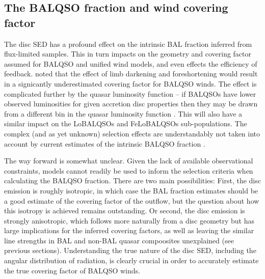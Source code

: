 \documentclass[preprint, a4paper, 11pt]{aastex}
\begin{document}
\subsection{The BALQSO fraction and wind covering factor}
\label{sec:balfrac}

The disc SED has a profound effect on the intrinsic BAL fraction
inferred from flux-limited samples. This in turn impacts on 
the geometry and covering factor assumed for BALQSO and unified wind models,
and even effects the efficiency of feedback.
\cite{krolik1998} noted that the effect of limb darkening and foreshortening
would result in a signicantly underestimated covering factor for BALQSO winds.
The effect is complicated further by the quasar luminosity function -- if 
BALQSOs have lower observed luminosities for given accretion disc properties 
then they may be drawn from a different bin in the quasar luminosity function 
\citep{goodrich1997}. This will also have a similar impact
on the LoBALQSOs and FeLoBALQSOs sub-populations.
The complex (and as yet unknown) selection effects are understandably 
not taken into account by current estimates of the intrinsic BALQSO fraction 
\citep{weymann1991, reichard2003, knigge2008, turnermiller2009, allen2011}. 

The way forward is somewhat unclear. Given the lack of available observational 
constraints, models cannot readily be used to inform the selection criteria when 
calculating the BALQSO fraction. There are two main possibilities:
First, the disc emission is roughly isotropic, in which case the BAL fraction
estimates should be a good estimate of the covering factor of the outflow,
but the question about how this isotropy is achieved remains outstanding.
Or second, the disc emission is strongly anisotropic, which follows more
naturally from a disc geometry but has large implications
for the inferred covering factors, as well as leaving the similar line strengths
in BAL and non-BAL quasar compoosites unexplained (see previous sections).
Understanding the true nature of the disc SED, including the
angular distribution of radiation, is clearly crucial in order
to accurately estimate the true covering factor of BALQSO winds.

\end{document}
